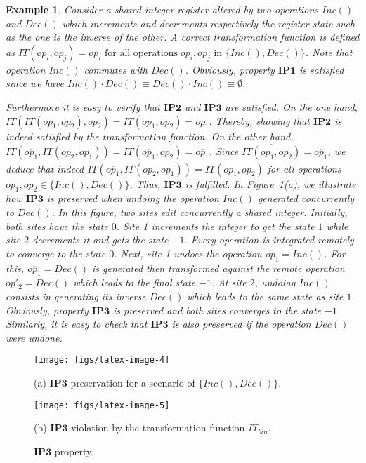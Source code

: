\documentclass[submission,copyright,creativecommons]{eptcs}
\newtheorem{example}{Example}
\begin{document}
\begin{example}\label{exmp:incDec}
Consider a shared integer register altered by two operations $Inc()$ and $Dec()$ which increments and decrements respectively the register state such as the one is the inverse of the other. A correct transformation function is defined as $IT(op_i,op_j)=op_i \mbox{ for all operations}\; op_i, op_j \mbox{ in } \{Inc(), Dec()\}$.  Note that operation $Inc()$ commutes with $Dec()$. Obviously, property $\mathbf{IP1}$ is satisfied since we have $  Inc() \cdot Dec() \equiv   Dec() \cdot Inc() \equiv \emptyset$.

Furthermore it is easy to verify that $\mathbf{IP2}$ and $\mathbf{IP3}$ are satisfied. On the one hand, $
IT(IT(op_1,op_2), \overline{op_2})= IT(op_1, \overline{op_2})=op_1.$
Thereby, showing that  $\mathbf{IP2}$ is indeed satisfied by the transformation function.
On the other hand, $
IT(\overline{op_1},IT(op_2,op_1))=IT(\overline{op_1},op_2)
=\overline{op_1}$. 
Since $\overline{IT(op_1,op_2)} = \overline{op_1}$,  
we  deduce that   indeed $IT(\overline{op_1},IT(op_2,op_1))= \overline{IT(op_1,op_2)}$ for all operations $op_1, op_2\in \{Inc(),Dec()\}$. Thus,  $\mathbf{IP3}$ is fulfilled. In Figure~\ref{fig:ip3}(a), we illustrate how $\mathbf{IP3}$ is preserved when undoing the operation $Inc()$ generated concurrently to $Dec()$. In this figure,  two sites  edit concurrently a shared integer. Initially, both sites have the state $0$. Site 1 increments the integer to get the state $1$ while site $2$ decrements it and gets the state $-1$. Every operation is integrated remotely to converge to the state $0$. Next, site 1 undoes the operation $op_1= Inc()$. For this,  $\overline{op_1}=Dec()$  is generated then transformed against the remote operation $op'_2=Dec()$ which leads to the final state $-1$. At site $2$, undoing $Inc()$ consists in generating its inverse $Dec()$ which leads to the same state as site $1$. Obviously, property $\mathbf{IP3}$ is preserved and both sites converges to the state $-1$.  Similarly, it is easy to check that $\mathbf{IP3}$ is also preserved if the operation $Dec()$ were undone.
\end{example}
\begin{figure}[htbp]
\begin{minipage}[t]{0.50\linewidth}
\begin{tiny}
\centerline{\texttt{[image: figs/latex-image-4]}}
\end{tiny}
\begin{small}
\centerline{(a) $\mathbf{IP3}$ preservation for a scenario of $\{Inc(), Dec()\}$.} 
\end{small}
\end{minipage}
\begin{minipage}[t]{0.50\linewidth}
\centerline{\texttt{[image: figs/latex-image-5]}}
\begin{small}
\centerline{(b) $\mathbf{IP3}$ violation by the transformation function $IT_{bin}$.}
\end{small}
\end{minipage}
\caption{$\mathbf{IP3}$ property.}\label{fig:ip3}
\end{figure}
\end{document}
